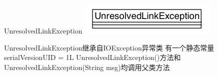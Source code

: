 \begin{XeClass}{UnresolvedLinkException}
\includegraphics[width=\textwidth]{cdig/UnresolvedLinkException.png}
     
 UnresolvedLinkException继承自IOException异常类
 有一个静态常量serialVersionUID = 1L
 UnresolvedLinkException()方法和UnresolvedLinkException(String msg)均调用父类方法

\end{XeClass}

